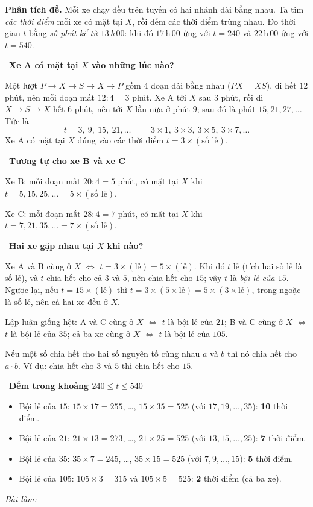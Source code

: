 \documentclass[11pt]{article}
\newif\ifsol \solfalse
\newcommand{\probsol}[1]{%
  \begin{lrbox}{\solmeasure}\begin{minipage}{\dimexpr\linewidth-24pt\relax}#1\end{minipage}\end{lrbox}%
  \ifsol
    \begin{solbox}#1\end{solbox}%
  \else
    \setlength{\solht}{\dimexpr\ht\solmeasure+\dp\solmeasure+0.85cm\relax}%
    \ifdim\solht<1.35cm\setlength{\solht}{1.35cm}\fi
    \ifdim\solht>\StudentMaxWork\setlength{\solht}{\StudentMaxWork}\fi
    \begin{tcolorbox}[colback=white,colframe=Line,boxrule=0.8pt,arc=5pt,
      left=8pt,right=8pt,top=4pt,bottom=4pt,height=\solht]{\footnotesize\color{Slate}\itshape\WorkWord}\end{tcolorbox}%
  \fi}
\newlength{\StudentMaxWork}\setlength{\StudentMaxWork}{7.5cm}
\newcommand{\step}[2]{\par\smallskip\noindent{\bfseries\color{tmBlue!85!black}\StepWord~#1.}\ {\bfseries #2}\par\nopagebreak}
\def\WorkWord{Bài làm:}
\def\StepWord{Bước}
\begin{document}
\probsol{
\textbf{Phân tích đề.} Mỗi xe chạy đều trên tuyến có hai nhánh dài bằng nhau. Ta tìm \emph{các thời điểm} mỗi xe có mặt tại $X$, rồi đếm các thời điểm trùng nhau. Đo thời gian $t$ bằng \emph{số phút kể từ $13$\,h\,$00$}: khi đó $17$\,h\,$00$ ứng với $t=240$ và $22$\,h\,$00$ ứng với $t=540$.

\step{1}{Xe A có mặt tại $X$ vào những lúc nào?}
Một lượt $P\to X\to S\to X\to P$ gồm $4$ đoạn dài bằng nhau ($PX=XS$), đi hết $12$ phút, nên mỗi đoạn mất $12:4=3$ phút. Xe A tới $X$ sau $3$ phút, rồi đi $X\to S\to X$ hết $6$ phút, nên tới $X$ lần nữa ở phút $9$; sau đó là phút $15, 21, 27,\dots$ Tức là
\[ t=3,\ 9,\ 15,\ 21,\dots \quad = 3\times 1,\ 3\times 3,\ 3\times 5,\ 3\times 7,\dots \]
Xe A có mặt tại $X$ đúng vào các thời điểm $t=3\times(\text{số lẻ})$.

\step{2}{Tương tự cho xe B và xe C}
Xe B: mỗi đoạn mất $20:4=5$ phút, có mặt tại $X$ khi $t=5,15,25,\dots=5\times(\text{số lẻ})$.\par
Xe C: mỗi đoạn mất $28:4=7$ phút, có mặt tại $X$ khi $t=7,21,35,\dots=7\times(\text{số lẻ})$.

\step{3}{Hai xe gặp nhau tại $X$ khi nào?}
\begin{proofbox}Xe A và B cùng ở $X$ $\iff$ $t=3\times(\text{lẻ})=5\times(\text{lẻ})$. Khi đó $t$ lẻ (tích hai số lẻ là số lẻ), và $t$ chia hết cho cả $3$ và $5$, nên chia hết cho $15$; vậy $t$ là \emph{bội lẻ của $15$}. Ngược lại, nếu $t=15\times(\text{lẻ})$ thì $t=3\times(5\times\text{lẻ})=5\times(3\times\text{lẻ})$, trong ngoặc là số lẻ, nên cả hai xe đều ở $X$.\end{proofbox}
Lập luận giống hệt: A và C cùng ở $X$ $\iff$ $t$ là bội lẻ của $21$; B và C cùng ở $X$ $\iff$ $t$ là bội lẻ của $35$; cả ba xe cùng ở $X$ $\iff$ $t$ là bội lẻ của $105$.
\begin{recallbox}Nếu một số chia hết cho hai số nguyên tố cùng nhau $a$ và $b$ thì nó chia hết cho $a\cdot b$. Ví dụ: chia hết cho $3$ và $5$ thì chia hết cho $15$.\end{recallbox}

\step{4}{Đếm trong khoảng $240\le t\le 540$}
\begin{itemize}[leftmargin=1.3em,itemsep=1pt]
\item Bội lẻ của $15$: $15\times 17=255$, \dots, $15\times 35=525$ (với $17,19,\dots,35$): \textbf{10} thời điểm.
\item Bội lẻ của $21$: $21\times 13=273$, \dots, $21\times 25=525$ (với $13,15,\dots,25$): \textbf{7} thời điểm.
\item Bội lẻ của $35$: $35\times 7=245$, \dots, $35\times 15=525$ (với $7,9,\dots,15$): \textbf{5} thời điểm.
\item Bội lẻ của $105$: $105\times 3=315$ và $105\times 5=525$: \textbf{2} thời điểm (cả ba xe).
\end{itemize}

}
\end{document}
